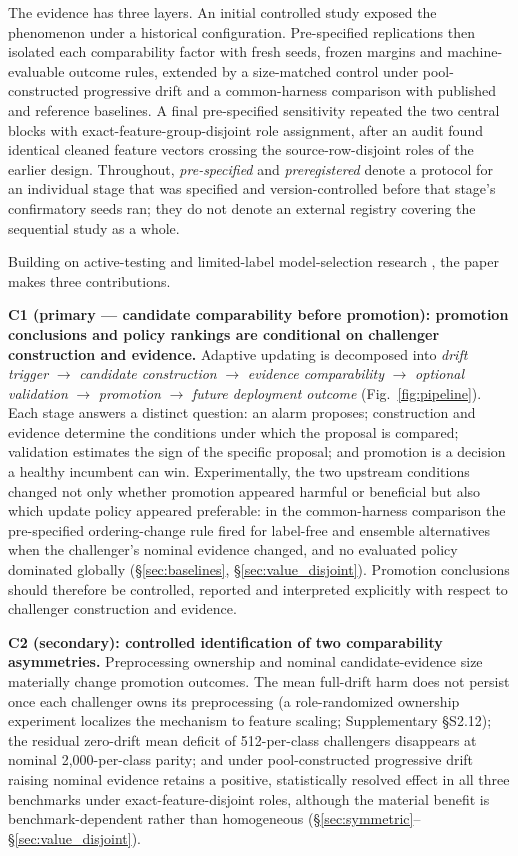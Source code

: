 \documentclass[a4paper,fleqn]{cas-sc}
\begin{document}
The evidence has three layers. An initial controlled study exposed the phenomenon under a historical configuration. Pre-specified replications then isolated each comparability factor with fresh seeds, frozen margins and machine-evaluable outcome rules, extended by a size-matched control under pool-constructed progressive drift and a common-harness comparison with published and reference baselines. A final pre-specified sensitivity repeated the two central blocks with exact-feature-group-disjoint role assignment, after an audit found identical cleaned feature vectors crossing the source-row-disjoint roles of the earlier design. Throughout, \emph{pre-specified} and \emph{preregistered} denote a protocol for an individual stage that was specified and version-controlled before that stage's confirmatory seeds ran; they do not denote an external registry covering the sequential study as a whole.


Building on active-testing and limited-label model-selection research \cite{sawade2012active,kossen2021active,karimi2021online,han2024model,okanovic2025models}, the paper makes three contributions.

\textbf{C1 (primary --- candidate comparability before promotion): promotion conclusions and policy rankings are conditional on challenger construction and evidence.} Adaptive updating is decomposed into \emph{drift trigger} $\to$ \emph{candidate construction} $\to$ \emph{evidence comparability} $\to$ \emph{optional validation} $\to$ \emph{promotion} $\to$ \emph{future deployment outcome} (Fig.~\ref{fig:pipeline}). Each stage answers a distinct question: an alarm proposes; construction and evidence determine the conditions under which the proposal is compared; validation estimates the sign of the specific proposal; and promotion is a decision a healthy incumbent can win. Experimentally, the two upstream conditions changed not only whether promotion appeared harmful or beneficial but also which update policy appeared preferable: in the common-harness comparison the pre-specified ordering-change rule fired for label-free and ensemble alternatives when the challenger's nominal evidence changed, and no evaluated policy dominated globally (\S\ref{sec:baselines}, \S\ref{sec:value_disjoint}). Promotion conclusions should therefore be controlled, reported and interpreted explicitly with respect to challenger construction and evidence.

\textbf{C2 (secondary): controlled identification of two comparability asymmetries.} Preprocessing ownership and nominal candidate-evidence size materially change promotion outcomes. The mean full-drift harm does not persist once each challenger owns its preprocessing (a role-randomized ownership experiment localizes the mechanism to feature scaling; Supplementary \S S2.12); the residual zero-drift mean deficit of 512-per-class challengers disappears at nominal 2{,}000-per-class parity; and under pool-constructed progressive drift raising nominal evidence retains a positive, statistically resolved effect in all three benchmarks under exact-feature-disjoint roles, although the material benefit is benchmark-dependent rather than homogeneous (\S\ref{sec:symmetric}--\S\ref{sec:value_disjoint}).
\end{document}
